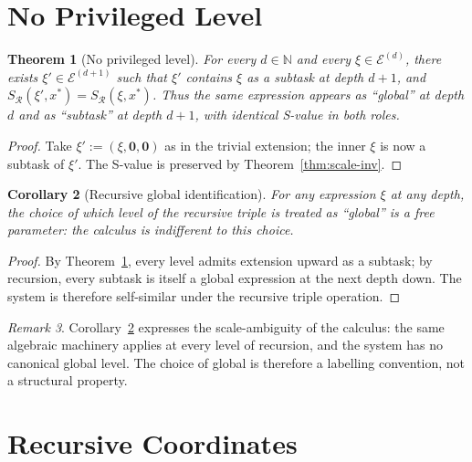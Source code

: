 \documentclass[twocolumn,11pt,a4paper]{article}
\theoremstyle{thmstyle}
\newtheorem{theorem}{Theorem}[section]
\newtheorem{corollary}[theorem]{Corollary}
\theoremstyle{thmstyle}
\theoremstyle{definition}
\theoremstyle{remark}
\newtheorem{remark}[theorem]{Remark}
\newcommand{\Natural}{\mathbb{N}}
\newcommand{\Expr}{\mathcal{E}}
\newcommand{\receiver}{\mathcal{R}}
\newcommand{\Sscalar}{S}
\begin{document}
\section{No Privileged Level}
\label{sec:no-privileged-level}

\begin{theorem}[No privileged level]\label{thm:no-priv-level}
For every $d \in \Natural$ and every $\xi \in
\Expr^{(d)}$, there exists $\xi' \in \Expr^{(d+1)}$
such that $\xi'$ contains $\xi$ as a subtask at depth
$d+1$, and $\Sscalar_{\receiver}(\xi', x^{*}) =
\Sscalar_{\receiver}(\xi, x^{*})$.  Thus the same
expression appears as ``global'' at depth $d$ and as
``subtask'' at depth $d+1$, with identical S-value
in both roles.
\end{theorem}

\begin{proof}
Take $\xi' := (\xi, \mathbf{0}, \mathbf{0})$ as in the
trivial extension; the inner $\xi$ is now a
subtask of $\xi'$.  The S-value is preserved by
Theorem~\ref{thm:scale-inv}.
\end{proof}

\begin{corollary}[Recursive global identification]
\label{cor:recursive-global}
For any expression $\xi$ at any depth, the choice of
which level of the recursive triple is treated as
``global'' is a free parameter: the calculus is
indifferent to this choice.
\end{corollary}

\begin{proof}
By Theorem~\ref{thm:no-priv-level}, every level admits
extension upward as a subtask; by recursion, every
subtask is itself a global expression at the next
depth down.  The system is therefore self-similar
under the recursive triple operation.
\end{proof}

\begin{remark}\label{rem:scale-ambiguity}
Corollary~\ref{cor:recursive-global} expresses the
scale-ambiguity of the calculus: the same algebraic
machinery applies at every level of recursion, and
the system has no canonical global level.  The
choice of global is therefore a labelling convention,
not a structural property.
\end{remark}

\section{Recursive Coordinates}
\label{sec:recursive-coordinates}
\end{document}
